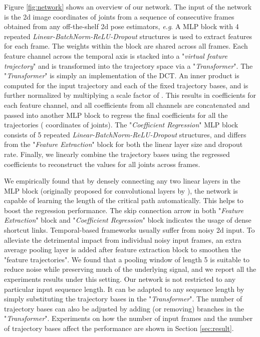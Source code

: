 \documentclass{bmvc2k}
\def\eg{\emph{e.g}\bmvaOneDot}
\begin{document}
Figure \ref{fig:network} shows an overview of our network. The input of the network is the 2d image coordinates of  joints from a sequence of  consecutive frames obtained from any off-the-shelf 2d pose estimators, \eg \cite{newell2016stacked, chen2018cascaded}. A MLP block with 4 repeated \textit{Linear-BatchNorm-ReLU-Dropout} structures is used to extract features for each frame. The weights within the block are shared across all frames. Each feature channel across the temporal axis is stacked into a "\textit{virtual feature trajectory}" and is transformed into the trajectory space via a "\textit{Transformer}". The "\textit{Transformer}" is simply an implementation of the DCT. An inner product is computed for the input trajectory and each of the fixed trajectory bases, and is further normalized by multiplying a scale factor of . This results in  coefficients for each feature channel, and all coefficients from all channels are concatenated and passed into another MLP block to regress the final  coefficients for all the  trajectories ( coordinates of  joints). The "\textit{Coefficient Regression}" MLP block consists of 5 repeated \textit{Linear-BatchNorm-ReLU-Dropout} structures, and differs from the "\textit{Feature Extraction}" block for both the linear layer size and dropout rate. Finally, we linearly combine the  trajectory bases using the regressed coefficients to reconstruct the  values for all  joints across  frames.

We empirically found that by densely connecting any two linear layers in the MLP block (originally proposed for convolutional layers by \cite{huang2017densely}), the network is capable of learning the length of the critical path automatically. This helps to boost the regression performance. The skip connection arrow in both "\textit{Feature Extraction}" block and "\textit{Coefficient Regression}" block indicates the usage of dense shortcut links.
Temporal-based frameworks usually suffer from noisy 2d input. To alleviate the detrimental impact from individual noisy input frames, an extra average pooling layer is added after feature extraction block to smoothen the "feature trajectories". We found that a pooling window of length 5 is suitable to reduce noise while preserving much of the underlying signal, and we report all the experiments results under this setting.
Our network is not restricted to any particular input sequence length. It can be adapted to any sequence length by simply substituting the trajectory bases in the "\textit{Transformer}". The number of trajectory bases can also be adjusted by adding (or removing) branches in the "\textit{Transformer}". Experiments on how the number of input frames and the number of trajectory bases affect the performance are shown in Section \ref{sec:result}.
\end{document}
